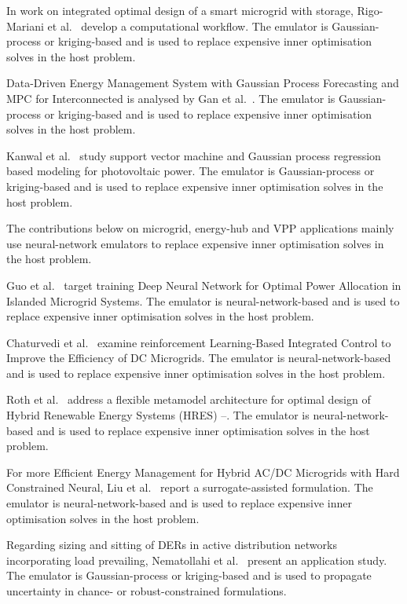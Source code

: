 In work on integrated optimal design of a smart microgrid with storage, Rigo-Mariani et al.~\cite{Rigo-Mariani20171762} develop a computational workflow. The emulator is Gaussian-process or kriging-based and is used to replace expensive inner optimisation solves in the host problem.

Data-Driven Energy Management System with Gaussian Process Forecasting and MPC for Interconnected is analysed by Gan et al.~\cite{Gan2021695}. The emulator is Gaussian-process or kriging-based and is used to replace expensive inner optimisation solves in the host problem.

Kanwal et al.~\cite{Kanwal2018117} study support vector machine and Gaussian process regression based modeling for photovoltaic power. The emulator is Gaussian-process or kriging-based and is used to replace expensive inner optimisation solves in the host problem.

The contributions below on microgrid, energy-hub and VPP applications mainly use neural-network emulators to replace expensive inner optimisation solves in the host problem.

Guo et al.~\cite{Guo20222057} target training Deep Neural Network for Optimal Power Allocation in Islanded Microgrid Systems. The emulator is neural-network-based and is used to replace expensive inner optimisation solves in the host problem.

Chaturvedi et al.~\cite{Chaturvedi2024149} examine reinforcement Learning-Based Integrated Control to Improve the Efficiency of DC Microgrids. The emulator is neural-network-based and is used to replace expensive inner optimisation solves in the host problem.

Roth et al.~\cite{Roth2019214} address a flexible metamodel architecture for optimal design of Hybrid Renewable Energy Systems (HRES) –. The emulator is neural-network-based and is used to replace expensive inner optimisation solves in the host problem.

For more Efficient Energy Management for Hybrid AC/DC Microgrids with Hard Constrained Neural, Liu et al.~\cite{Liu20242534} report a surrogate-assisted formulation. The emulator is neural-network-based and is used to replace expensive inner optimisation solves in the host problem.

Regarding sizing and sitting of DERs in active distribution networks incorporating load prevailing, Nematollahi et al.~\cite{Nematollahi2021} present an application study. The emulator is Gaussian-process or kriging-based and is used to propagate uncertainty in chance- or robust-constrained formulations.

